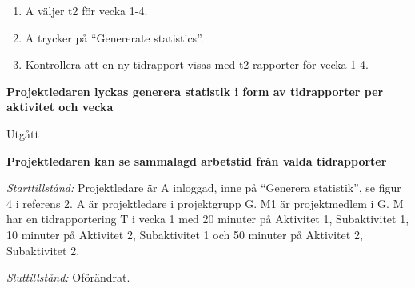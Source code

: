 \documentclass[a4paper]{article}
\begin{document}
\begin{FT}
\begin{enumerate}
\item A väljer t2 för vecka 1-4.
\item A trycker på ``Genererate statistics''.
\item Kontrollera att en ny tidrapport visas med t2 rapporter för vecka 1-4.
\end{enumerate}


\item
\textbf{Projektledaren lyckas generera statistik i form av tidrapporter per aktivitet och vecka}

Utgått





\item
\textbf{Projektledaren kan se sammalagd arbetstid från valda tidrapporter}

\emph{Starttillstånd:} Projektledare är A inloggad, inne på ``Generera statistik'', se figur 4 i referens 2. A är projektledare i projektgrupp G. M1 är projektmedlem i G. M har en tidrapportering T i vecka 1 med 20 minuter på Aktivitet 1, Subaktivitet 1, 10 minuter på Aktivitet 2, Subaktivitet 1 och 50 minuter på Aktivitet 2, Subaktivitet 2.

\emph{Sluttillstånd:} Oförändrat.


\end{FT}
\end{document}

